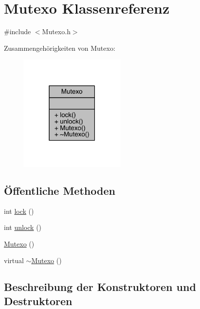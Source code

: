 \hypertarget{class_mutexo}{}\section{Mutexo Klassenreferenz}
\label{class_mutexo}


{\ttfamily \#include $<$Mutexo.\+h$>$}



Zusammengehörigkeiten von Mutexo\+:
\nopagebreak
\begin{figure}[H]
\begin{center}
\leavevmode
\includegraphics[width=150pt]{class_mutexo__coll__graph}
\end{center}
\end{figure}
\subsection*{Öffentliche Methoden}
\begin{DoxyCompactItemize}
\item 
int \hyperlink{class_mutexo_a22aac64070af68adc9acc1fef3d3f4aa}{lock} ()
\item 
int \hyperlink{class_mutexo_a9f51083616ed99edc2add313f840016c}{unlock} ()
\item 
\hyperlink{class_mutexo_a56f219370b120853d4176fb67a4fd847}{Mutexo} ()
\item 
virtual \hyperlink{class_mutexo_af8942ad328e7c91931f63e6a243081d1}{$\sim$\+Mutexo} ()
\end{DoxyCompactItemize}


\subsection{Beschreibung der Konstruktoren und Destruktoren}
\hypertarget{class_mutexo_a56f219370b120853d4176fb67a4fd847}{}\label{class_mutexo_a56f219370b120853d4176fb67a4fd847} 
